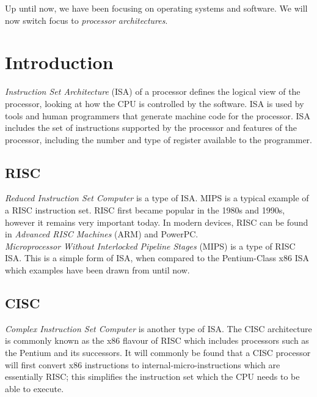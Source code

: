 
Up until now, we have been focusing on operating systems and software. We will now switch focus to \textit{processor architectures}. 

\section{Introduction}
\textit{Instruction Set Architecture} (ISA) of a processor defines the logical view of the processor, looking at how the CPU is controlled by the software. ISA is used by tools and human programmers that generate machine code for the processor. ISA includes the set of instructions supported by the processor and features of the processor, including the number and type of register available to the programmer.
\subsection{RISC}
\textit{Reduced Instruction Set Computer} is a type of ISA. MIPS is a typical example of a RISC instruction set. RISC first became popular in the 1980s and 1990s, however it remains very important today. In modern devices, RISC can be found in \textit{Advanced RISC Machines} (ARM) and PowerPC. \\

\textit{Microprocessor Without Interlocked Pipeline Stages} (MIPS) is a type of RISC ISA. This is a simple form of ISA, when compared to the Pentium-Class x86 ISA which examples have been drawn from until now.

\subsection{CISC}
\textit{Complex Instruction Set Computer} is another type of ISA. The CISC architecture is commonly known as the x86 flavour of RISC which includes processors such as the Pentium and its successors. It will commonly be found that a CISC processor will first convert x86 instructions to internal-micro-instructions which are essentially RISC; this simplifies the instruction set which the CPU needs to be able to execute.

